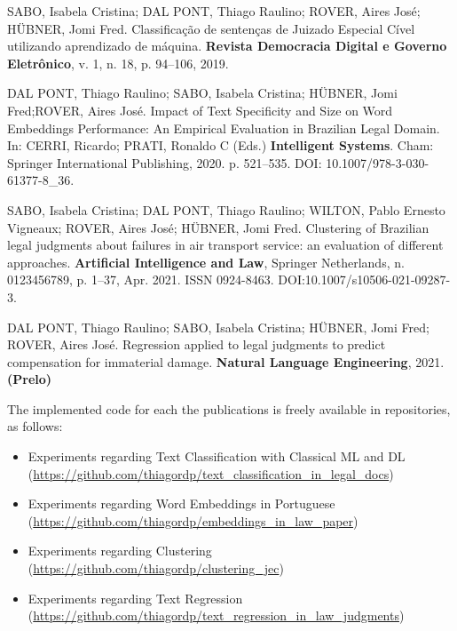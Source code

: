 \begin{flushleft}

SABO, Isabela Cristina; DAL PONT, Thiago Raulino; ROVER, Aires José; HÜBNER, Jomi Fred. Classificação de sentenças de Juizado Especial Cível utilizando aprendizado de máquina. \textbf{Revista Democracia Digital e Governo Eletrônico}, v. 1, n. 18, p. 94–106, 2019.

\vspace{1em}

DAL PONT, Thiago Raulino; SABO, Isabela Cristina; HÜBNER, Jomi Fred;ROVER, Aires José. Impact of Text Specificity and Size on Word Embeddings Performance: An Empirical Evaluation in Brazilian Legal Domain. In: CERRI, Ricardo; PRATI, Ronaldo C (Eds.) \textbf{Intelligent Systems}. Cham: Springer International Publishing, 2020. p. 521–535. DOI: 10.1007/978-3-030-61377-8\_36.

\vspace{1em}

SABO, Isabela Cristina; DAL PONT, Thiago Raulino; WILTON, Pablo Ernesto Vigneaux; ROVER, Aires José; HÜBNER, Jomi Fred. Clustering of Brazilian legal judgments about failures in air transport service: an evaluation of different approaches. \textbf{Artificial Intelligence and Law}, Springer Netherlands, n. 0123456789, p. 1–37, Apr. 2021. ISSN 0924-8463. DOI:10.1007/s10506-021-09287-3.

\vspace{1em}

DAL PONT, Thiago Raulino; SABO, Isabela Cristina; HÜBNER, Jomi Fred; ROVER, Aires José. Regression applied to legal judgments to predict compensation for immaterial damage. \textbf{Natural Language Engineering}, 2021. \textbf{(Prelo)}
 
\end{flushleft}

The implemented code for each the publications
is freely available in repositories, as follows:

\begin{itemize}[noitemsep]
   
    \item Experiments regarding Text Classification with Classical \gls{ML} and \gls{DL} (\url{https://github.com/thiagordp/text_classification_in_legal_docs})
    \item Experiments regarding Word Embeddings in Portuguese (\url{https://github.com/thiagordp/embeddings_in_law_paper})
     \item Experiments regarding Clustering (\url{https://github.com/thiagordp/clustering_jec})
    \item Experiments regarding Text Regression  (\url{https://github.com/thiagordp/text_regression_in_law_judgments})

\end{itemize}



